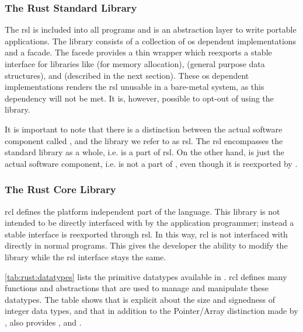 \subsubsection{The Rust Standard Library}
\label{sec:rsl}

The \gls{rsl} is included into all {\rust} programs and is an abstraction layer to write portable applications.
The library consists of a collection of \gls{os} dependent implementations and a facade.
The facede provides a thin wrapper which reexports a stable interface for libraries like  (for memory allocation),  (general purpose data structures), and {\core} (described in the next section).
These \gls{os} dependent implementations renders the \gls{rsl} unusable in a bare-metal system, as this dependency will not be met.
It is, however, possible to opt-out of using the library.

It is important to note that there is a distinction between the actual software component called {\std}, and the library we refer to as \gls{rsl}.
The \gls{rsl} encompasses the standard library as a whole, i.e.  is a part of \gls{rsl}.
On the other hand, {\std} is just the actual software component, i.e.  is not a part of {\std}, even though it is reexported by {\std}.

\subsubsection{The Rust Core Library}
\label{sec:rcl}

\gls{rcl} defines the platform independent part of the language.
This library is not intended to be directly interfaced with by the application programmer; instead a stable interface is reexported through \gls{rsl}.
In this way, \gls{rcl} is not interfaced with directly in normal {\rust} programs.
This gives the developer the ability to modify the library while the \gls{rsl} interface stays the same.

\autoref{tab:rust:datatypes} lists the primitive datatypes available in {\rust}.
\gls{rcl} defines many functions and abstractions that are used to manage and manipulate these datatypes.
The table shows that {\rust} is explicit about the size and signedness of integer data types, and that in addition to the Pointer/Array distinction made by {\C}, {\rust} also provides ,  and .

